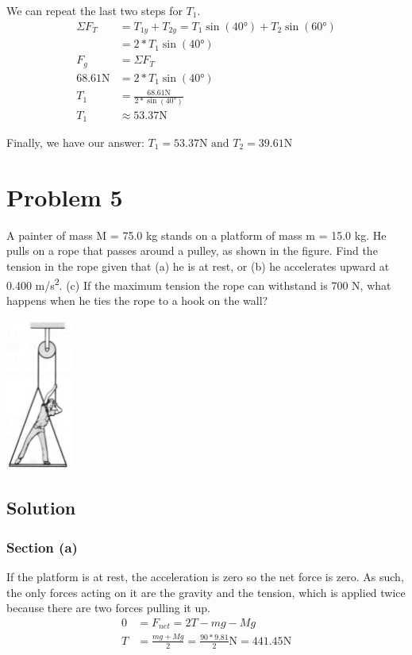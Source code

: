 \documentclass[12pt]{article}
\begin{document}
We can repeat the last two steps for $T_1$.
\begin{align*}
    \Sigma F_T &= T_{1y} + T_{2y}
            = T_1\sin(40\unit{\degree}) + T_2\sin(60\unit{\degree})\\
            &= 2 * T_1\sin(40\unit{\degree})\\
    F_g &= \Sigma F_T\\
    68.61\unit{\newton} &= 2*T_1 \sin(40\unit{\degree})\\
    T_1 &= \frac{68.61\unit{\newton}}{2*\sin(40\unit{\degree})}\\
    T_1 &\approx \boxed{ 53.37\unit{\newton} }
\end{align*}

Finally, we have our answer: $\boxed{ T_1 = 53.37\unit{\newton} \text{ and } T_2 = 39.61\unit{\newton} }$

\pagebreak
\section*{Problem 5}
A painter of mass M = 75.0 kg stands on a platform of mass m = 15.0 kg. He pulls on a rope that passes around a pulley, as shown in the figure. Find the tension in the rope given that (a) he is at rest, or (b) he accelerates upward at 0.400 \unit{\meter/\second^2}. (c) If the maximum tension the rope can withstand is 700 N, what happens when he ties the rope to a hook on the wall?

\begin{center}
    \includegraphics*[height=5cm]{graph_5.png}
\end{center}

\subsection*{Solution}
\subsubsection*{Section (a)}
If the platform is at rest, the acceleration is zero so the net force is zero. As such, the only forces acting on it are the gravity and the tension, which is applied twice because there are two forces pulling it up.
\begin{align*}
    0 &= F_{net} = 2T - mg - Mg\\
    T &= \frac{mg + Mg}{2} = \frac{90*9.81}{2}\unit{\newton} = \boxed{441.45 \unit{\newton}}
\end{align*}
\end{document}
